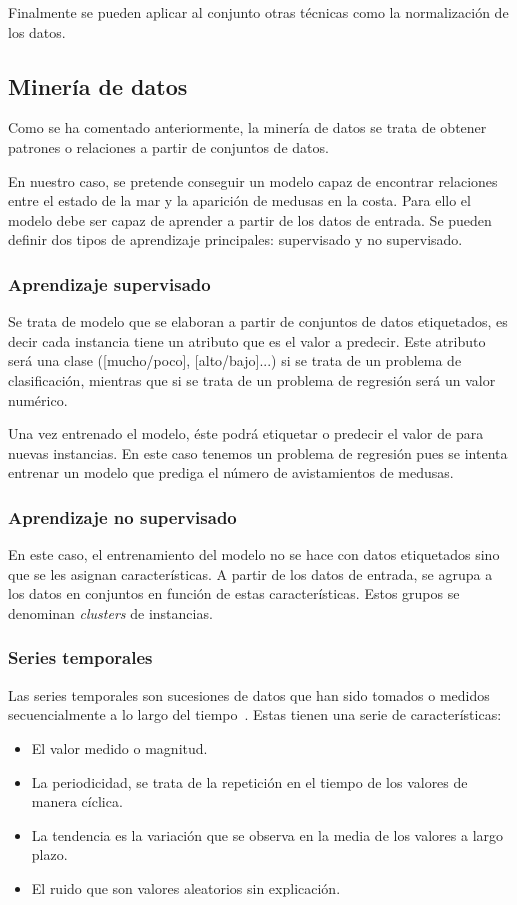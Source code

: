 Finalmente se pueden aplicar al conjunto otras técnicas como la normalización de los datos.

\subsection{Minería de datos}
Como se ha comentado anteriormente, la minería de datos se trata de obtener patrones o relaciones a partir de conjuntos de datos.

En nuestro caso, se pretende conseguir un modelo capaz de encontrar relaciones entre el estado de la mar y la aparición de medusas en la costa. Para ello el modelo debe ser capaz de aprender a partir de los datos de entrada. Se pueden definir dos tipos de aprendizaje principales: supervisado y no supervisado.

\subsubsection{Aprendizaje supervisado}
Se trata de modelo que se elaboran a partir de conjuntos de datos etiquetados, es decir cada instancia tiene un atributo que es el valor a predecir. Este atributo será una clase ([mucho/poco], [alto/bajo]...) si se trata de un problema de clasificación, mientras que si se trata de un problema de regresión será un valor numérico.

Una vez entrenado el modelo, éste podrá etiquetar o predecir el valor de para nuevas instancias.
En este caso tenemos un problema de regresión pues se intenta entrenar un modelo que prediga el número de avistamientos de medusas.

\subsubsection{Aprendizaje no supervisado}
En este caso, el entrenamiento del modelo no se hace con datos etiquetados sino que se les asignan características. A partir de los datos de entrada, se agrupa a los datos en conjuntos en función de estas características. Estos grupos se denominan \emph{clusters} de instancias.

\subsubsection{Series temporales}
Las series temporales son sucesiones de datos que han sido tomados o medidos  secuencialmente a lo largo del tiempo~\cite{SeriesTempUBU}.
Estas tienen una serie de características:
\begin{itemize}
	\item El valor medido o magnitud.
	\item La periodicidad, se trata de la repetición en el tiempo de los valores de manera cíclica.
	\item La tendencia es la variación que se observa en la media de los valores a largo plazo.
	\item El ruido que son valores aleatorios sin explicación.
\end{itemize}

